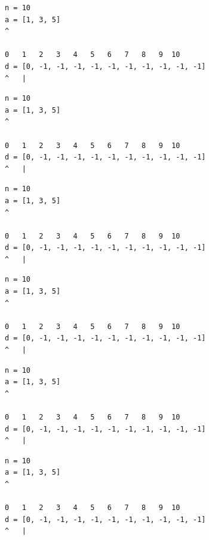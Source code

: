 \begin{frame}[fragile]
\begin{verbatim}
n = 10
a = [1, 3, 5]
^

0   1   2   3   4   5   6   7   8   9  10
d = [0, -1, -1, -1, -1, -1, -1, -1, -1, -1, -1]
^   |
\end{verbatim}
\end{frame}
\addtocounter{framenumber}{-1}

\begin{frame}[fragile]
\begin{verbatim}
n = 10
a = [1, 3, 5]
^

0   1   2   3   4   5   6   7   8   9  10
d = [0, -1, -1, -1, -1, -1, -1, -1, -1, -1, -1]
^   |
\end{verbatim}
\end{frame}
\addtocounter{framenumber}{-1}

\begin{frame}[fragile]
\begin{verbatim}
n = 10
a = [1, 3, 5]
^

0   1   2   3   4   5   6   7   8   9  10
d = [0, -1, -1, -1, -1, -1, -1, -1, -1, -1, -1]
^   |
\end{verbatim}
\end{frame}
\addtocounter{framenumber}{-1}

\begin{frame}[fragile]
\begin{verbatim}
n = 10
a = [1, 3, 5]
^

0   1   2   3   4   5   6   7   8   9  10
d = [0, -1, -1, -1, -1, -1, -1, -1, -1, -1, -1]
^   |
\end{verbatim}
\end{frame}
\addtocounter{framenumber}{-1}

\begin{frame}[fragile]
\begin{verbatim}
n = 10
a = [1, 3, 5]
^

0   1   2   3   4   5   6   7   8   9  10
d = [0, -1, -1, -1, -1, -1, -1, -1, -1, -1, -1]
^   |
\end{verbatim}
\end{frame}
\addtocounter{framenumber}{-1}

\begin{frame}[fragile]
\begin{verbatim}
n = 10
a = [1, 3, 5]
^

0   1   2   3   4   5   6   7   8   9  10
d = [0, -1, -1, -1, -1, -1, -1, -1, -1, -1, -1]
^   |
\end{verbatim}
\end{frame}
\addtocounter{framenumber}{-1}

